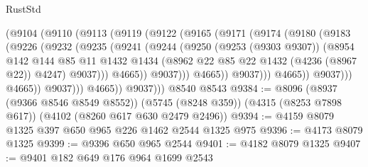 \begin{lexlean}{RustStd}
\begin{coremodule}
                          (@9104
                            (@9110
                              (@9113
                                (@9119
                                  (@9122
                                    (@9165
                                      (@9171
                                        (@9174
                                          (@9180
                                            (@9183
                                              (@9226
                                                (@9232
                                                  (@9235
                                                    (@9241
                                                      (@9244
                                                        (@9250
                                                          (@9253 (@9303 @9307))
                                                          (@8954
                                                            @142
                                                            @144
                                                            @85
                                                            @11
                                                            @1432
                                                            @1434
                                                            (@8962
                                                              @22
                                                              @85
                                                              @22
                                                              @1432
                                                              (@4236 (@8967 @22))
                                                              @4247)
                                                            @9037)))
                                                      @4665))
                                                  @9037)))
                                            @4665))
                                        @9037)))
                                  @4665))
                              @9037)))
                        @4665))
                    @9037)))
              @4665))
          @9037)))
    @8540
    @8543
@9384 := @8096
    (@8937 (@9366 @8546 @8549 @8552))
    (@5745 (@8248 @359))
    (@4315 (@8253 @7898 @617))
    (@4102 (@8260 @617 @630 @2479 @2496))
@9394 := @4159 @8079 @1325 @397 @650 @965 @226 @1462 @2544 @1325 @975
@9396 := @4173 @8079 @1325
@9399 := @9396 @650 @965 @2544
@9401 := @4182 @8079 @1325
@9407 := @9401 @182 @649 @176 @964 @1699 @2543

\end{coremodule}
\end{lexlean}
